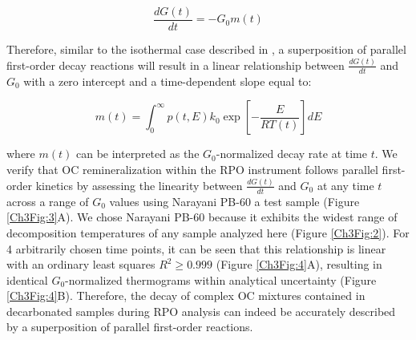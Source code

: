 \begin{equation} \label{Ch3Eq:13}
	\frac{dG(t)}{dt} = - G_{0} m(t)
\end{equation}

Therefore, similar to the isothermal case described in \citet{Follett:2014if}, a superposition of parallel first-order decay reactions will result in a linear relationship between $\frac{dG(t)}{dt}$ and $G_{0}$ with a zero intercept and a time-dependent slope equal to:

\begin{equation}\label{Ch3Eq:14}
 	m(t) = \int_{0}^{\infty} p(t, E) k_{0} \exp \left[ - \frac{E}{RT(t)} \right] dE
\end{equation}

where $m(t)$ can be interpreted as the $G_{0}$-normalized decay rate at time $t$. We verify that OC remineralization within the RPO instrument follows parallel first-order kinetics by assessing the linearity between $\frac{dG(t)}{dt}$ and $G_{0}$ at any time $t$ across a range of $G_{0}$ values using Narayani PB-60 a test sample (Figure \ref{Ch3Fig:3}A). We chose Narayani PB-60 because it exhibits the widest range of decomposition temperatures of any sample analyzed here (Figure \ref{Ch3Fig:2}). For 4 arbitrarily chosen time points, it can be seen that this relationship is linear with an ordinary least squares $R^{2} \geq 0.999$ (Figure \ref{Ch3Fig:4}A), resulting in identical $G_{0}$-normalized thermograms within analytical uncertainty (Figure \ref{Ch3Fig:4}B). Therefore, the decay of complex OC mixtures contained in decarbonated samples during RPO analysis can indeed be accurately described by a superposition of parallel first-order reactions.

